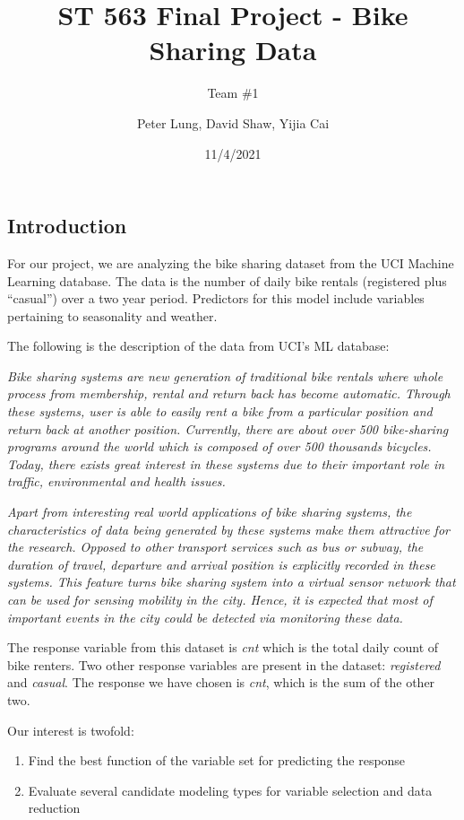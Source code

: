 \documentclass[
]{article}
\title{ST 563 Final Project - Bike Sharing Data}
\subtitle{Team \#1}
\author{Peter Lung, David Shaw, Yijia Cai}
\date{11/4/2021}
\begin{document}
\maketitle

\newpage

\hypertarget{introduction}{%
\subsection{Introduction}\label{introduction}}

For our project, we are analyzing the bike sharing dataset from the UCI
Machine Learning database. The data is the number of daily bike rentals
(registered plus ``casual'') over a two year period. Predictors for this
model include variables pertaining to seasonality and weather.

The following is the description of the data from UCI's ML database:

\emph{Bike sharing systems are new generation of traditional bike
rentals where whole process from membership, rental and return back has
become automatic. Through these systems, user is able to easily rent a
bike from a particular position and return back at another position.
Currently, there are about over 500 bike-sharing programs around the
world which is composed of over 500 thousands bicycles. Today, there
exists great interest in these systems due to their important role in
traffic, environmental and health issues.}

\emph{Apart from interesting real world applications of bike sharing
systems, the characteristics of data being generated by these systems
make them attractive for the research. Opposed to other transport
services such as bus or subway, the duration of travel, departure and
arrival position is explicitly recorded in these systems. This feature
turns bike sharing system into a virtual sensor network that can be used
for sensing mobility in the city. Hence, it is expected that most of
important events in the city could be detected via monitoring these
data.}

The response variable from this dataset is \emph{cnt} which is the total
daily count of bike renters. Two other response variables are present in
the dataset: \emph{registered} and \emph{casual}. The response we have
chosen is \emph{cnt}, which is the sum of the other two.

Our interest is twofold:

\begin{enumerate}
\def\labelenumi{(\arabic{enumi})}
\item
  Find the best function of the variable set for predicting the response
\item
  Evaluate several candidate modeling types for variable selection and
  data reduction
\end{enumerate}
\end{document}
